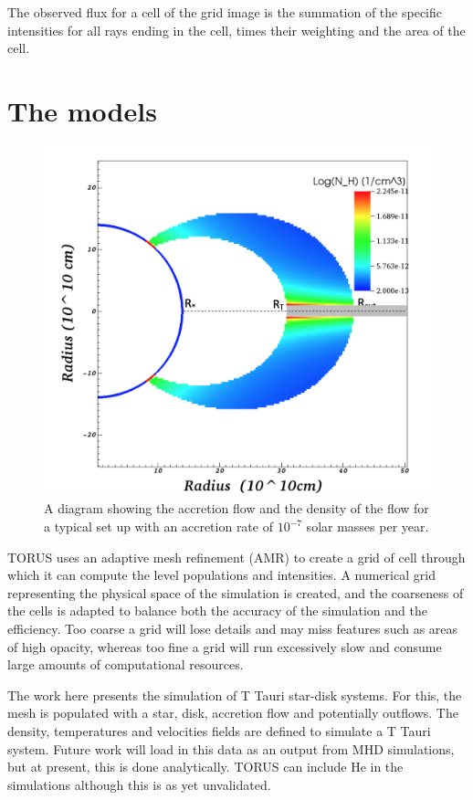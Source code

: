 \documentclass[fleqn,usenatbib]{mnras}
\begin{document}
The observed flux for a cell of the grid image is the summation of the specific intensities for all rays ending in the cell, times their weighting and the area of the cell.

\section{The models}
\label{sec:model}

\begin{figure}
    \centering
    \includegraphics[width=\linewidth]{figures/Accretion}
    \caption{A diagram showing the accretion flow and the density of the flow for a typical set up with an accretion rate of $10^{-7}$ solar masses per year.}
    \label{fig:accretionflow}
\end{figure}
TORUS uses an adaptive mesh refinement (AMR) to create a grid of cell through which it can compute the level populations and intensities.  A numerical grid representing the physical space of the simulation is created, and the coarseness of the cells is adapted to balance both the accuracy of the simulation and the efficiency. Too coarse a grid will lose details and may miss features such as areas of high opacity, whereas too fine a grid will run excessively slow and consume large amounts of computational resources.

The work here presents the simulation of T Tauri star-disk systems. For this, the mesh is populated with a star, disk, accretion flow and potentially outflows. The density, temperatures and velocities fields are defined to simulate a T Tauri system. Future work will load in this data as an output from MHD simulations, but at present, this is done analytically. TORUS can include He in the simulations although this is as yet unvalidated. 
\end{document}
